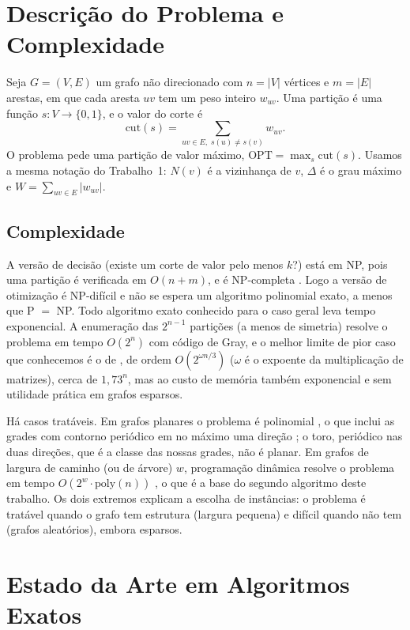 \section{Descrição do Problema e Complexidade}

Seja $G=(V,E)$ um grafo não direcionado com $n=|V|$ vértices e $m=|E|$ arestas, em que cada aresta $uv$ tem um peso inteiro $w_{uv}$. Uma partição é uma função $s:V\to\{0,1\}$, e o valor do corte é
\begin{equation}
  \mathrm{cut}(s)=\sum_{uv\in E,\; s(u)\neq s(v)} w_{uv}.
\end{equation}
O problema pede uma partição de valor máximo, $\mathrm{OPT}=\max_s \mathrm{cut}(s)$. Usamos a mesma notação do Trabalho~1: $N(v)$ é a vizinhança de $v$, $\Delta$ é o grau máximo e $W=\sum_{uv\in E}|w_{uv}|$.

\subsection{Complexidade}

A versão de decisão (existe um corte de valor pelo menos $k$?) está em NP, pois uma partição é verificada em $O(n+m)$, e é NP-completa \cite{Karp 1972, Garey et al. 1976}. Logo a versão de otimização é NP-difícil e não se espera um algoritmo polinomial exato, a menos que P $=$ NP. Todo algoritmo exato conhecido para o caso geral leva tempo exponencial. A enumeração das $2^{n-1}$ partições (a menos de simetria) resolve o problema em tempo $O(2^n)$ com código de Gray, e o melhor limite de pior caso que conhecemos é o de \citet{Williams 2005}, de ordem $O(2^{\omega n/3})$ ($\omega$ é o expoente da multiplicação de matrizes), cerca de $1{,}73^n$, mas ao custo de memória também exponencial e sem utilidade prática em grafos esparsos.

Há casos tratáveis. Em grafos planares o problema é polinomial \cite{Hadlock 1975}, o que inclui as grades com contorno periódico em no máximo uma direção \cite{Liers et al. 2003}; o toro, periódico nas duas direções, que é a classe das nossas grades, não é planar. Em grafos de largura de caminho (ou de árvore) $w$, programação dinâmica resolve o problema em tempo $O(2^{w}\cdot \mathrm{poly}(n))$ \cite{Arnborg et al. 1991, Bodlaender 1993}, o que é a base do segundo algoritmo deste trabalho. Os dois extremos explicam a escolha de instâncias: o problema é tratável quando o grafo tem estrutura (largura pequena) e difícil quando não tem (grafos aleatórios), embora esparsos.

\section{Estado da Arte em Algoritmos Exatos}

